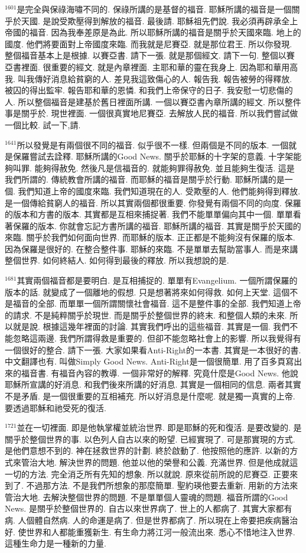 \documentclass{book}
\begin{document}
$^{1601}$是完全與保祿海嘯不同的.
保祿所講的是基督的福音.
耶穌所講的福音是一個關乎於天國.
是說受欺壓得到解放的福音.
最後請.
耶穌祖先們說.
我必須再辟承全上帝國的福音.
因為我奉差原是為此.
所以耶穌所講的福音是關乎於天國來臨.
地上的國度.
他們將要面對上帝國度來臨.
而我就是尼賽亞.
就是那位君王.
所以你發現.
整個福音基本上是根據.
以賽亞書.
請下一張.
就是那個經文.
請下一句.
整個以賽亞書裡面.
很重要的經文.
就是內章裡面.
主耶和華的靈在我身上.
因為耶和華用高我.
叫我傳好消息給貧窮的人.
差見我這致傷心的人.
報告我.
報告被勞的得釋放.
被囚的得出監牢.
報告耶和華的恩憐.
和我們上帝保守的日子.
我安慰一切悲傷的人.
所以整個福音是建基於舊日裡面所講.
一個以賽亞書內章所講的經文.
所以整件事是關乎於.
現世裡面.
一個很真實地尼賽亞.
去解放人民的福音.
所以我們嘗試做一個比較.
試一下,請.

$^{1641}$所以發覺是有兩個很不同的福音.
似乎很不一樣.
但兩個是不同的版本.
一個就是保羅嘗試去詮釋.
耶穌所講的Good News.
關乎於耶穌的十字架的意義.
十字架能夠叫罪.
能夠得赦免.
然後凡是信福音的.
就能夠罪得赦免.
並且能夠生復活.
這是我們所謂的.
傳統教會所講的福音.
而耶穌的福音是關乎於行動.
耶穌所講的是一個.
我們知道上帝的國度來臨.
我們知道現在的人.
受欺壓的人.
他們能夠得到釋放.
是一個傳給貧窮人的福音.
所以其實兩個都很重要.
你發覺有兩個不同的向度.
保羅的版本和方書的版本.
其實都是互相來捕捉著.
我們不能單單偏向其中一個.
單單看著保羅的版本.
你就會忘記方書所講的福音.
耶穌所講的福音.
其實是關乎於天國的來臨.
關乎於我們如何面向世界.
而耶穌的版本.
正正都是不能夠沒有保羅的版本.
因為保羅是很好的.
在整合整件事.
耶穌的來臨.
不是單單去幫助當事人.
而是來講整個世界.
如何終結人.
如何得到最後的釋放.
所以我想說的是.

$^{1681}$其實兩個福音都是要明白.
是互相捕捉的.
單單有Evangelium.
一個所謂保羅的版本的話.
就變成了一個離地的假想.
只是想著將來如何得救.
如何上天堂.
這個不是福音的全部.
而單單一個所謂關懷社會福音.
這不是整件事的全部.
我們知道上帝的請求.
不是純粹關乎於現世.
而是關乎於整個世界的終末.
和整個人類的未來.
所以就是說.
根據這幾年裡面的討論.
其實我們呼出的這些福音.
其實是一個.
我們不能忽略這兩邊.
我們所謂得救是重要的.
但卻不能忽略社會上的影響.
所以我覺得有一個很好的整合.
請下一張.
大家如果看Anti-Right的一本書.
其實是一本很好的書.
中文翻譯也有.
叫做Simply Good News.
Anti-Right是一個很簡單.
用了百多頁寫出來的福音書.
有福音內容的教導.
一個非常好的解釋.
究竟什麼是Good News.
他說耶穌所宣講的好消息.
和我們後來所講的好消息.
其實是一個相同的信息.
兩者其實不是矛盾.
是一個很重要的互相補充.
所以好消息是什麼呢.
就是獨一真實的上帝.
要透過耶穌和祂受死的復活.

$^{1721}$並在一切裡面.
即是他執掌權並統治世界.
即是耶穌的死和復活.
是要改變的.
是關乎於整個世界的事.
以色列人自古以來的盼望.
已經實現了.
可是那實現的方式.
是他們意想不到的.
神在拯救世界的計劃.
終於啟動了.
他按照他的應許.
以新的方式來管治大地.
解決世界的問題.
他並以他的榮譽和公義.
充滿世界.
但是他成就這一切的方法.
完全消乏所有先知的想象.
所以就說.
原來從前所說的尼賽亞.
正要來到了.
不過那方法.
不是我們所想象的那麼簡單.
聖約瑛他要去重新.
用新的方法來管治大地.
去解決整個世界的問題.
不是單單個人靈魂的問題.
福音所謂的Good News.
是關乎於整個世界的.
自古以來世界病了.
世上的人都病了.
其實大家都有病.
人個體自然病.
人的命運是病了.
但是世界都病了.
所以現在上帝要把疾病醫治好.
使世界和人都能重獲新生.
有生命力將江河一般流出來.
悉心不惜地注入世界.
這種生命力是一種新的力量.
\end{document}
